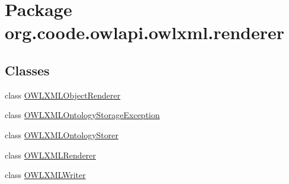 \hypertarget{namespaceorg_1_1coode_1_1owlapi_1_1owlxml_1_1renderer}{\section{Package org.\-coode.\-owlapi.\-owlxml.\-renderer}
\label{namespaceorg_1_1coode_1_1owlapi_1_1owlxml_1_1renderer}
}
\subsection*{Classes}
\begin{DoxyCompactItemize}
\item 
class \hyperlink{classorg_1_1coode_1_1owlapi_1_1owlxml_1_1renderer_1_1_o_w_l_x_m_l_object_renderer}{O\-W\-L\-X\-M\-L\-Object\-Renderer}
\item 
class \hyperlink{classorg_1_1coode_1_1owlapi_1_1owlxml_1_1renderer_1_1_o_w_l_x_m_l_ontology_storage_exception}{O\-W\-L\-X\-M\-L\-Ontology\-Storage\-Exception}
\item 
class \hyperlink{classorg_1_1coode_1_1owlapi_1_1owlxml_1_1renderer_1_1_o_w_l_x_m_l_ontology_storer}{O\-W\-L\-X\-M\-L\-Ontology\-Storer}
\item 
class \hyperlink{classorg_1_1coode_1_1owlapi_1_1owlxml_1_1renderer_1_1_o_w_l_x_m_l_renderer}{O\-W\-L\-X\-M\-L\-Renderer}
\item 
class \hyperlink{classorg_1_1coode_1_1owlapi_1_1owlxml_1_1renderer_1_1_o_w_l_x_m_l_writer}{O\-W\-L\-X\-M\-L\-Writer}
\end{DoxyCompactItemize}
